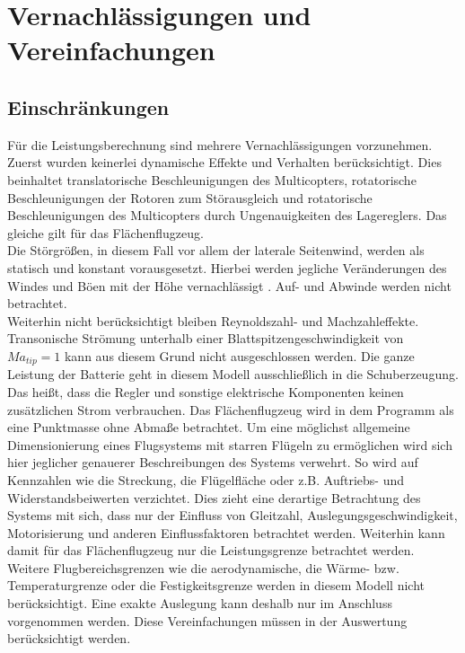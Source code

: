 \section{Vernachlässigungen und Vereinfachungen}
\label{sec:vernachlaessigungen_vereinfachungen}

\subsection{Einschränkungen}
Für die Leistungsberechnung sind mehrere Vernachlässigungen vorzunehmen. Zuerst wurden keinerlei dynamische Effekte und Verhalten berücksichtigt. Dies beinhaltet translatorische Beschleunigungen des Multicopters, rotatorische Beschleunigungen der Rotoren zum Störausgleich und rotatorische Beschleunigungen des Multicopters durch Ungenauigkeiten des Lagereglers. Das gleiche gilt für das Flächenflugzeug. \\
Die Störgrößen, in diesem Fall vor allem der laterale Seitenwind, werden als statisch und konstant vorausgesetzt. Hierbei werden jegliche Veränderungen des Windes und Böen mit der Höhe vernachlässigt \cite{Seidel.2011}. Auf- und Abwinde werden nicht betrachtet. \\
Weiterhin nicht berücksichtigt bleiben Reynoldszahl- und Machzahleffekte. Transonische Strömung unterhalb einer Blattspitzengeschwindigkeit von \ensuremath{Ma_{tip}=1} kann aus diesem Grund nicht ausgeschlossen werden.
Die ganze Leistung der Batterie geht in diesem Modell ausschließlich in die Schuberzeugung. Das heißt, dass die Regler und sonstige elektrische Komponenten keinen zusätzlichen Strom verbrauchen.
Das Flächenflugzeug wird in dem Programm als eine Punktmasse ohne Abmaße betrachtet. Um eine möglichst allgemeine Dimensionierung eines Flugsystems mit starren Flügeln zu ermöglichen wird sich hier jeglicher genauerer Beschreibungen des Systems verwehrt. So wird auf Kennzahlen wie die Streckung, die Flügelfläche oder z.B. Auftriebs- und Widerstandsbeiwerten verzichtet. Dies zieht eine derartige Betrachtung des Systems mit sich, dass nur der Einfluss von Gleitzahl, Auslegungsgeschwindigkeit, Motorisierung und anderen Einflussfaktoren betrachtet werden. Weiterhin kann damit für das Flächenflugzeug nur die Leistungsgrenze betrachtet werden. Weitere Flugbereichsgrenzen wie die aerodynamische, die Wärme- bzw. Temperaturgrenze oder die Festigkeitsgrenze werden in diesem Modell nicht berücksichtigt. 
Eine exakte Auslegung kann deshalb nur im Anschluss vorgenommen werden. Diese Vereinfachungen müssen in der Auswertung berücksichtigt werden.

